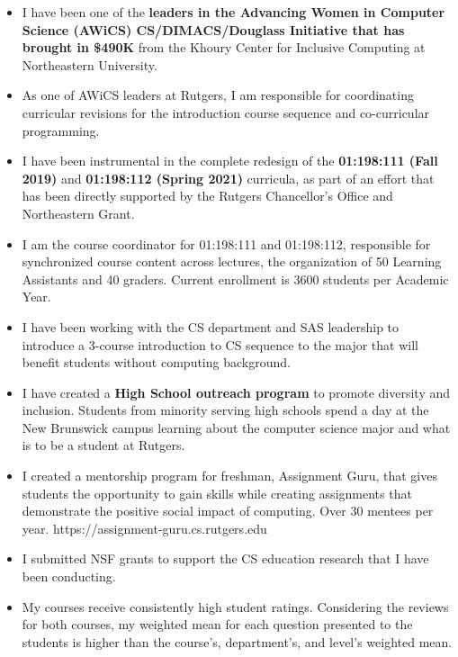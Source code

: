 \documentclass[11pt]{article}
\begin{document}
\begin{itemize}

  \item I have been one of the {\bf leaders in the Advancing Women in
    Computer Science (AWiCS) CS/DIMACS/Douglass Initiative that has
    brought in \$490K} from the Khoury Center for Inclusive Computing
    at Northeastern University.

  \item As one of AWiCS leaders at Rutgers, I am responsible for
    coordinating curricular revisions for the introduction course
    sequence and co-curricular programming.
    
  \item I have been instrumental in the complete redesign of the {\bf
    01:198:111 (Fall 2019)} and {\bf 01:198:112 (Spring 2021)}
    curricula, as part of an effort that has been directly supported
    by the Rutgers Chancellor's Office and Northeastern Grant.

  \item I am the course coordinator for 01:198:111 and 01:198:112,
    responsible for synchronized course content across lectures, the
    organization of 50 Learning Assistants and 40 graders. Current
    enrollment is 3600 students per Academic Year.
    
  \item I have been working with the CS department and SAS leadership
    to introduce a 3-course introduction to CS sequence to the major
    that will benefit students without computing background.
    
  \item I have created a {\bf High School outreach program} to promote
    diversity and inclusion. Students from minority serving high
    schools spend a day at the New Brunswick campus learning about the
    computer science major and what is to be a student at Rutgers.
        
  \item I created a mentorship program for freshman, Assignment Guru,
    that gives students the opportunity to gain skills while creating
    assignments that demonstrate the positive social impact of
    computing. Over 30 mentees per year. https://assignment-guru.cs.rutgers.edu
    
  \item I submitted NSF grants to support the CS education research that
    I have been conducting.
    
  \item My courses receive consistently high student
    ratings. Considering the reviews for both courses, my weighted
    mean for each question presented to the students is higher than
    the course's, department's, and level's weighted mean.
    
\end{itemize}
\end{document}
